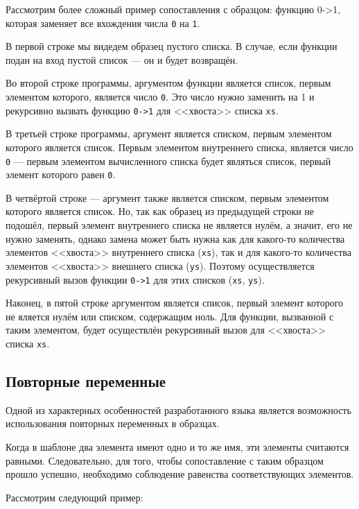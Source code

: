     Рассмотрим более сложный пример сопоставления с образцом: функцию 0->1, которая заменяет все вхождения числа \verb,0, на \verb,1,.
    

    В первой строке мы видедем образец пустого списка.
    В случае, если функции подан на вход пустой список --- он и будет возвращён.

    Во второй строке программы, аргументом функции является список, первым элементом которого, является число \verb,0,.
    Это число нужно заменить на 1 и рекурсивно вызвать функцию \verb,0->1, для <<хвоста>> списка \verb,xs,.

    В третьей строке программы, аргумент является списком, первым элементом которого является список.
    Первым элементом внутреннего списка, является число \verb,0, --- первым элементом вычисленного списка будет являться список, первый элемент которого равен \verb,0,.

    В четвёртой строке --- аргумент также является списком, первым элементом которого является список.
    Но, так как образец из предыдущей строки не подошёл, первый элемент внутреннего списка не является нулём, а значит, его не нужно заменять, однако замена может быть нужна как для какого-то количества элементов <<хвоста>> внутреннего списка (\verb,xs,), так и для какого-то количества элементов <<хвоста>> внешнего списка (\verb,ys,).
    Поэтому осуществляется рекурсивный вызов функции \verb$0->1$ для этих списков (\verb,xs,, \verb,ys,).

    Наконец, в пятой строке аргументом является список, первый элемент которого не яляется нулём или списком, содержащим ноль.
    Для функции, вызванной с таким элементом, будет осуществлён рекурсивный вызов для <<хвоста>> списка \verb,xs,.
    
    \subsection{Повторные переменные}
    Одной из характерных особенностей разработанного языка является возможность использования повторных переменных в образцах.

    Когда в шаблоне два элемента имеют одно и то же имя, эти элементы считаются равными.
    Следовательно, для того, чтобы сопоставление с таким образцом прошло успешно, необходимо соблюдение равенства соответствующих элементов.

    Рассмотрим следующий пример:

    

